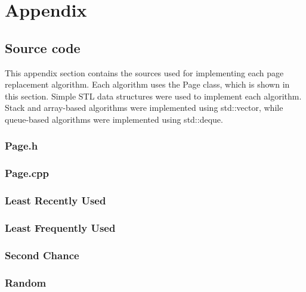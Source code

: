 \documentclass[paper=a4, fontsize=11pt]{scrartcl} %
\numberwithin{equation}{section} %
\numberwithin{figure}{section} %
\numberwithin{table}{section} %
\begin{document}

\section{Appendix}


\subsection{Source code}
This appendix section contains the sources used for implementing each page replacement algorithm. Each algorithm uses the Page class, which is shown in this section. Simple STL data structures were used to implement each algorithm. Stack and array-based algorithms were implemented using std::vector, while queue-based algorithms were implemented using std::deque. 


\subsubsection{Page.h}

\subsubsection{Page.cpp}

\pagebreak

\subsubsection{Least Recently Used}

\pagebreak

\subsubsection{Least Frequently Used}

\pagebreak

\subsubsection{Second Chance}

\pagebreak

\subsubsection{Random}

\end{document}
